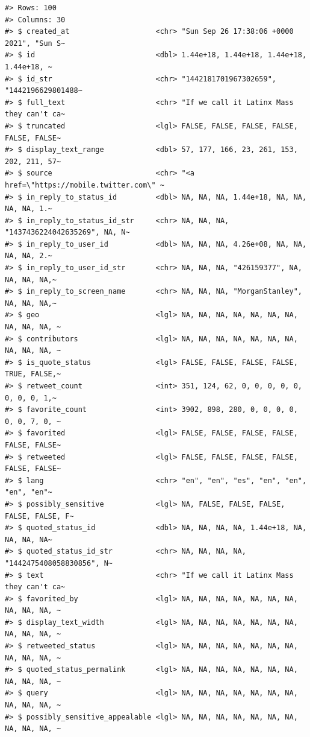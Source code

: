 \documentclass[
  letterpaper,
]{latex/krantz}
\begin{document}
\begin{verbatim}
#> Rows: 100
#> Columns: 30
#> $ created_at                    <chr> "Sun Sep 26 17:38:06 +0000 2021", "Sun S~
#> $ id                            <dbl> 1.44e+18, 1.44e+18, 1.44e+18, 1.44e+18, ~
#> $ id_str                        <chr> "1442181701967302659", "1442196629801488~
#> $ full_text                     <chr> "If we call it Latinx Mass they can't ca~
#> $ truncated                     <lgl> FALSE, FALSE, FALSE, FALSE, FALSE, FALSE~
#> $ display_text_range            <dbl> 57, 177, 166, 23, 261, 153, 202, 211, 57~
#> $ source                        <chr> "<a href=\"https://mobile.twitter.com\" ~
#> $ in_reply_to_status_id         <dbl> NA, NA, NA, 1.44e+18, NA, NA, NA, NA, 1.~
#> $ in_reply_to_status_id_str     <chr> NA, NA, NA, "1437436224042635269", NA, N~
#> $ in_reply_to_user_id           <dbl> NA, NA, NA, 4.26e+08, NA, NA, NA, NA, 2.~
#> $ in_reply_to_user_id_str       <chr> NA, NA, NA, "426159377", NA, NA, NA, NA,~
#> $ in_reply_to_screen_name       <chr> NA, NA, NA, "MorganStanley", NA, NA, NA,~
#> $ geo                           <lgl> NA, NA, NA, NA, NA, NA, NA, NA, NA, NA, ~
#> $ contributors                  <lgl> NA, NA, NA, NA, NA, NA, NA, NA, NA, NA, ~
#> $ is_quote_status               <lgl> FALSE, FALSE, FALSE, FALSE, TRUE, FALSE,~
#> $ retweet_count                 <int> 351, 124, 62, 0, 0, 0, 0, 0, 0, 0, 0, 1,~
#> $ favorite_count                <int> 3902, 898, 280, 0, 0, 0, 0, 0, 0, 7, 0, ~
#> $ favorited                     <lgl> FALSE, FALSE, FALSE, FALSE, FALSE, FALSE~
#> $ retweeted                     <lgl> FALSE, FALSE, FALSE, FALSE, FALSE, FALSE~
#> $ lang                          <chr> "en", "en", "es", "en", "en", "en", "en"~
#> $ possibly_sensitive            <lgl> NA, FALSE, FALSE, FALSE, FALSE, FALSE, F~
#> $ quoted_status_id              <dbl> NA, NA, NA, NA, 1.44e+18, NA, NA, NA, NA~
#> $ quoted_status_id_str          <chr> NA, NA, NA, NA, "1442475408058830856", N~
#> $ text                          <chr> "If we call it Latinx Mass they can't ca~
#> $ favorited_by                  <lgl> NA, NA, NA, NA, NA, NA, NA, NA, NA, NA, ~
#> $ display_text_width            <lgl> NA, NA, NA, NA, NA, NA, NA, NA, NA, NA, ~
#> $ retweeted_status              <lgl> NA, NA, NA, NA, NA, NA, NA, NA, NA, NA, ~
#> $ quoted_status_permalink       <lgl> NA, NA, NA, NA, NA, NA, NA, NA, NA, NA, ~
#> $ query                         <lgl> NA, NA, NA, NA, NA, NA, NA, NA, NA, NA, ~
#> $ possibly_sensitive_appealable <lgl> NA, NA, NA, NA, NA, NA, NA, NA, NA, NA, ~
\end{verbatim}
\end{document}
